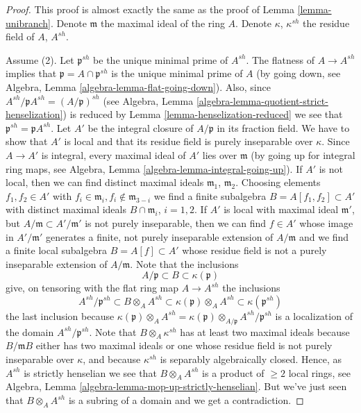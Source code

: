 \begin{proof}
This proof is almost exactly the same as the proof of
Lemma \ref{lemma-unibranch}.
Denote $\mathfrak m$ the maximal ideal of the ring $A$.
Denote $\kappa$, $\kappa^{sh}$ the residue field of $A$, $A^{sh}$.

\medskip\noindent
Assume (2). Let $\mathfrak p^{sh}$ be the unique minimal prime of
$A^{sh}$. The flatness of $A \to A^{sh}$ implies that
$\mathfrak p = A \cap \mathfrak p^{sh}$ is the unique minimal
prime of $A$ (by going down, see
Algebra, Lemma \ref{algebra-lemma-flat-going-down}).
Also, since $A^{sh}/\mathfrak pA^{sh} = (A/\mathfrak p)^{sh}$ (see
Algebra, Lemma \ref{algebra-lemma-quotient-strict-henselization})
is reduced by Lemma \ref{lemma-henselization-reduced}
we see that $\mathfrak p^{sh} = \mathfrak pA^{sh}$.
Let $A'$ be the integral closure of $A/\mathfrak p$ in its fraction
field. We have to show that $A'$ is local and that its residue
field is purely inseparable over $\kappa$.
Since $A \to A'$ is integral, every maximal ideal of $A'$ lies over
$\mathfrak m$ (by going up for integral ring maps, see
Algebra, Lemma \ref{algebra-lemma-integral-going-up}).
If $A'$ is not local, then we can find distinct maximal ideals
$\mathfrak m_1$, $\mathfrak m_2$. Choosing elements $f_1, f_2 \in A'$
with $f_i \in \mathfrak m_i, f_i \not \in \mathfrak m_{3 - i}$ we find
a finite subalgebra $B = A[f_1, f_2] \subset A'$ with distinct maximal
ideals $B \cap \mathfrak m_i$, $i = 1, 2$. If $A'$ is local with maximal
ideal $\mathfrak m'$, but $A/\mathfrak m \subset A'/\mathfrak m'$
is not purely inseparable, then we can find $f \in A'$ whose image in
$A'/\mathfrak m'$ generates a finite, not purely inseparable extension
of $A/\mathfrak m$ and we find a finite local subalgebra $B = A[f] \subset A'$
whose residue field is not a purely inseparable extension of $A/\mathfrak m$.
Note that the inclusions
$$
A/\mathfrak p \subset B \subset \kappa(\mathfrak p)
$$
give, on tensoring with the flat ring map $A \to A^{sh}$ the inclusions
$$
A^{sh}/\mathfrak p^{sh} \subset
B \otimes_A A^{sh} \subset
\kappa(\mathfrak p) \otimes_A A^{sh} \subset
\kappa(\mathfrak p^{sh})
$$
the last inclusion because
$\kappa(\mathfrak p) \otimes_A A^{sh} =
\kappa(\mathfrak p) \otimes_{A/\mathfrak p} A^{sh}/\mathfrak p^{sh}$
is a localization of the domain $A^{sh}/\mathfrak p^{sh}$.
Note that $B \otimes_A \kappa^{sh}$ has at least two maximal ideals
because $B/\mathfrak mB$ either has two maximal ideals or one whose
residue field is not purely inseparable over $\kappa$, and because
$\kappa^{sh}$ is separably algebraically closed. Hence, as
$A^{sh}$ is strictly henselian we see that
$B \otimes_A A^{sh}$ is a product of $\geq 2$ local rings, see
Algebra, Lemma \ref{algebra-lemma-mop-up-strictly-henselian}.
But we've just seen that $B \otimes_A A^{sh}$ is a subring of a domain
and we get a contradiction.


\end{proof}
